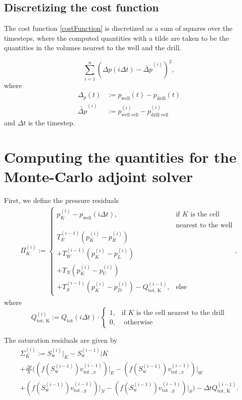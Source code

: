 \documentclass[conference]{IEEEtran}
\begin{document}
\subsection{Discretizing the cost function}
The cost function \eqref{costFunction} is discretized as a sum of squares over the timesteps, where the computed quantities with a tilde are taken to be the quantities in the volumes nearest to the well and the drill.

\begin{equation}
\sum_{i=1}^{n} (\Delta p(i\Delta t) - \tilde{\Delta p}^{(i)})^2,
\end{equation}
where
\begin{align}
\Delta_p(t) &:= p_\text{well}(t) - p_\text{drill}(t) \\
\tilde{\Delta p}^{(i)} &:= p_\text{well cell}^{(i)} - p_\text{drill cell}^{(i)}
\end{align}
and $\Delta t$ is the timestep.

\section{Computing the quantities for the Monte-Carlo adjoint solver}

First, we define the pressure residuals
\begin{multline}
\Pi_K^{(i)} := \begin{cases} p_K^{(i)} - p_\text{well}(i\Delta t), & \text{if } K \text{ is the cell}\\&\text{nearest to the well}\\T_E^{(i-1)} (p_K^{(i)} - p_R^{(i)}) \\+ T_W^{(i-1)} (p_K^{(i)} - p_L^{(i)}) \\+ T_N ( p_K^{(i)} - p_U^{(i)}) \\+ T_S^{(i-1)} (p_K^{(i)} - p_D^{(i)}) - Q_\text{tot, K}^{(i-1)}, & \text{else}\end{cases}, 
\end{multline}
where
\begin{equation}
Q_\text{tot, K}^{(i)} := Q_\text{tot}(i\Delta t) \cdot \begin{cases} 1, &\text{if } K \text{ is the cell nearest to the drill}\\0, &\text{ otherwise} \end{cases}
\end{equation}

The saturation residuals are given by
\begin{multline}
\Sigma_K^{(i)} := S_\text{w}^{(i)}\lvert_K - S_\text{w}^{(i-1)}\lvert{K} \\+ \frac{\Delta t}{h} \biggr((f(S_\text{w}^{(i-1)})v_{\text{tot }, x}^{(i-1)})\lvert_E - (f(S_\text{w}^{(i-1)})v_{\text{tot }, x}^{(i-1)})\lvert_W \\+ (f(S_\text{w}^{(i-1)})v_{\text{tot }, y}^{(i-1)})\lvert_N - (f(S_\text{w}^{(i-1)})v_{\text{tot }, y}^{(i-1)})\lvert_S\biggr) - \Delta t Q_\text{tot, K}^{(i-1)}.
\end{multline}
\end{document}

